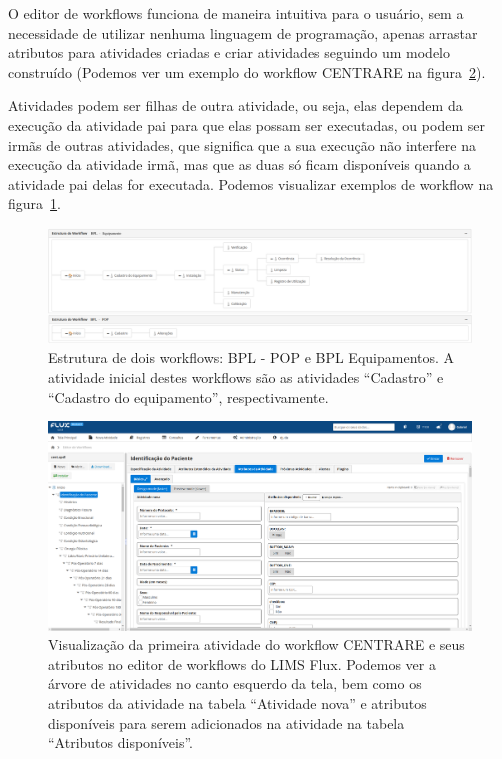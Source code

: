 O editor de workflows funciona de maneira intuitiva para o usuário, sem a necessidade de utilizar nenhuma linguagem de programação, apenas arrastar atributos para atividades criadas e criar atividades seguindo um modelo construído (Podemos ver um exemplo do workflow CENTRARE na figura~\ref{fig:editor_centrare}).

Atividades podem ser filhas de outra atividade, ou seja, elas dependem da execução da atividade pai para que elas possam ser executadas, ou podem ser irmãs de outras atividades, que significa que a sua execução não interfere na execução da atividade irmã, mas que as duas só ficam disponíveis quando a atividade pai delas for executada. Podemos visualizar exemplos de workflow na figura~\ref{fig:estrutura_workflow}.

\begin{figure}
    \centering
    \includegraphics[width=1\textwidth]{imgs/BPL/estrutura.png}
    \caption{Estrutura de dois workflows: BPL - POP e BPL Equipamentos. A atividade inicial destes workflows são as atividades ``Cadastro'' e ``Cadastro do equipamento'', respectivamente.}
    \label{fig:estrutura_workflow}
\end{figure}

\begin{figure}
    \centering
    \includegraphics[width=1\textwidth]{imgs/Flux/Workflows/Editor/editor_centrare.png}
    \caption{Visualização da primeira atividade do workflow CENTRARE e seus atributos no editor de workflows do LIMS Flux. Podemos ver a árvore de atividades no canto esquerdo da tela, bem como os atributos da atividade na tabela ``Atividade nova'' e atributos disponíveis para serem adicionados na atividade na tabela ``Atributos disponíveis''.}
    \label{fig:editor_centrare}
\end{figure}

